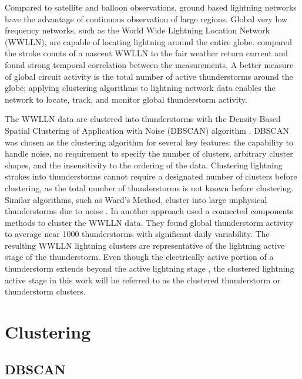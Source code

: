 Compared to satellite and balloon observations, ground based lightning networks have the advantage of continuous observation of large regions.
Global very low frequency networks, such as the World Wide Lightning Location Network (WWLLN), are capable of locating lightning around the entire globe.
\citet{Holzworth2005} compared the stroke counts of a nascent WWLLN to the fair weather return current and found strong temporal correlation between the measurements.
A better measure of global circuit activity is the total number of active thunderstorms around the globe; applying clustering algorithms to lightning network data enables the network to locate, track, and monitor global thunderstorm activity.

The WWLLN data are clustered into thunderstorms with the Density-Based Spatial Clustering of Application with Noise (DBSCAN) algorithm \citep{Ester1996, Kriegel2011a}.
DBSCAN was chosen as the clustering algorithm for several key features: the capability to handle noise, no requirement to specify the number of clusters, arbitrary cluster shapes, and the insensitivity to the ordering of the data.
Clustering lightning strokes into thunderstorms cannot require a designated number of clusters before clustering, as the total number of thunderstorms is not known before clustering.
Similar algorithms, such as Ward's Method, cluster into large unphysical thunderstorms due to noise \citep{Ward1963}.
In another approach \citet{Mezuman2013a} used a connected components methods to cluster the WWLLN data.
They found global thunderstorm activity to average near 1000 thunderstorms with significant daily variability.
The resulting WWLLN lightning clusters are representative of the lightning active stage of the thunderstorm.
Even though the electrically active portion of a thunderstorm extends beyond the active lightning stage \citep{Jacobson1976, Stolzenburg2010}, the clustered lightning active stage in this work will be referred to as the clustered thunderstorm or thunderstorm clusters.

\section{Clustering}

\subsection{DBSCAN}

